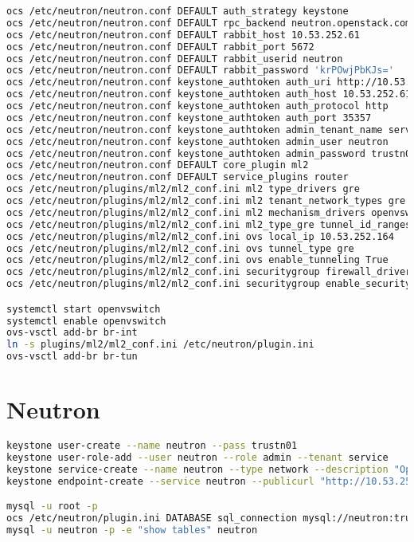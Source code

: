 \documentclass[11pt,letterpaper,oneside]{book}
\begin{document}
\begin{lstlisting}[caption={vircmppaw001},language=bash]
ocs /etc/neutron/neutron.conf DEFAULT auth_strategy keystone
ocs /etc/neutron/neutron.conf DEFAULT rpc_backend neutron.openstack.common.rpc.impl_kombu
ocs /etc/neutron/neutron.conf DEFAULT rabbit_host 10.53.252.61
ocs /etc/neutron/neutron.conf DEFAULT rabbit_port 5672
ocs /etc/neutron/neutron.conf DEFAULT rabbit_userid neutron
ocs /etc/neutron/neutron.conf DEFAULT rabbit_password 'krPOwjPbKJs='
ocs /etc/neutron/neutron.conf keystone_authtoken auth_uri http://10.53.252.61:5000
ocs /etc/neutron/neutron.conf keystone_authtoken auth_host 10.53.252.61
ocs /etc/neutron/neutron.conf keystone_authtoken auth_protocol http
ocs /etc/neutron/neutron.conf keystone_authtoken auth_port 35357
ocs /etc/neutron/neutron.conf keystone_authtoken admin_tenant_name service
ocs /etc/neutron/neutron.conf keystone_authtoken admin_user neutron
ocs /etc/neutron/neutron.conf keystone_authtoken admin_password trustn01
ocs /etc/neutron/neutron.conf DEFAULT core_plugin ml2
ocs /etc/neutron/neutron.conf DEFAULT service_plugins router
ocs /etc/neutron/plugins/ml2/ml2_conf.ini ml2 type_drivers gre
ocs /etc/neutron/plugins/ml2/ml2_conf.ini ml2 tenant_network_types gre
ocs /etc/neutron/plugins/ml2/ml2_conf.ini ml2 mechanism_drivers openvswitch
ocs /etc/neutron/plugins/ml2/ml2_conf.ini ml2_type_gre tunnel_id_ranges 1:1000
ocs /etc/neutron/plugins/ml2/ml2_conf.ini ovs local_ip 10.53.252.164
ocs /etc/neutron/plugins/ml2/ml2_conf.ini ovs tunnel_type gre
ocs /etc/neutron/plugins/ml2/ml2_conf.ini ovs enable_tunneling True
ocs /etc/neutron/plugins/ml2/ml2_conf.ini securitygroup firewall_driver neutron.agent.linux.iptables_firewall.OVSHybridIptablesFirewallDriver
ocs /etc/neutron/plugins/ml2/ml2_conf.ini securitygroup enable_security_group True

systemctl start openvswitch 
systemctl enable openvswitch 
ovs-vsctl add-br br-int
ln -s plugins/ml2/ml2_conf.ini /etc/neutron/plugin.ini 
ovs-vsctl add-br br-tun


\end{lstlisting}

\chapter{Neutron}

\begin{lstlisting}[caption={Neutron virctlpaw001},language=bash]
keystone user-create --name neutron --pass trustn01
keystone user-role-add --user neutron --role admin --tenant service
keystone service-create --name neutron --type network --description "OpenStack Networking Service"
keystone endpoint-create --service neutron --publicurl "http://10.53.252.63:9696" --adminurl "http://10.53.252.63:9696" --internalurl "http://10.53.252.63:9696"

mysql -u root -p
ocs /etc/neutron/plugin.ini DATABASE sql_connection mysql://neutron:trustn01@10.53.252.61/neutron_ml2
mysql -u neutron -p -e "show tables" neutron
\end{lstlisting}
\end{document}
